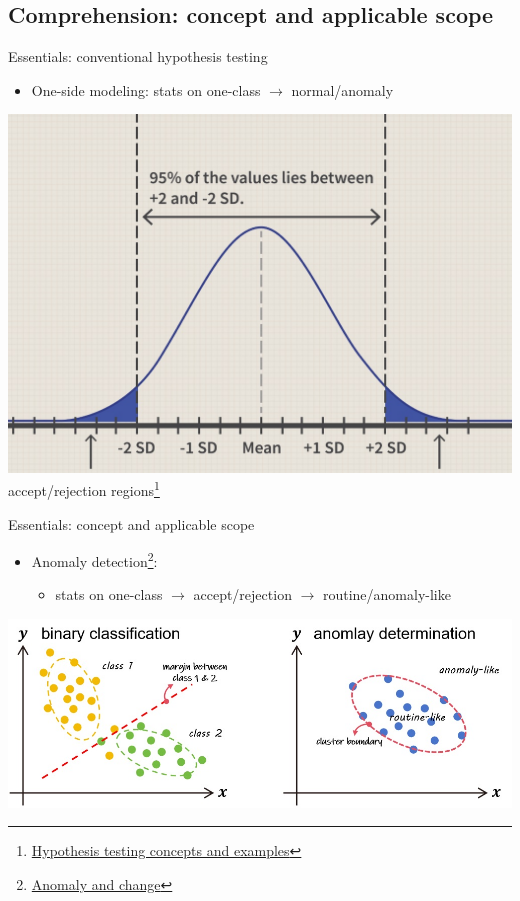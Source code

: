\documentclass[11pt]{beamer}
\newcommand{\uniitem}[1]{\begin{itemize}\item #1 \end{itemize}}
\newcommand{\ftref}[2]{{\color{blue}\footnotesize \href{#1}{#2}}}
\begin{document}
\subsection{Comprehension: concept and applicable scope}

\begin{frame}{Essentials: conventional hypothesis testing}
	\uniitem{One-side modeling: stats on one-class $\rightarrow$ normal/anomaly}
	\centering
	\includegraphics[scale=0.45]{hypotest.jpg}\\
	accept/rejection regions\footnote[frame]{\ftref{https://www.investopedia.com/articles/active-trading/092214/hypothesis-testing-finance-concept-examples.asp}{Hypothesis testing concepts and examples}}
\end{frame}

\begin{frame}{Essentials: concept and applicable scope}
	\uniitem{Anomaly detection\footnote[frame]{\ftref{https://informatics.readthedocs.io/en/latest/supplement/supp\_b2.html\#id1}{Anomaly and change}}:
		\uniitem{stats on one-class $\rightarrow$ accept/rejection $\rightarrow$ routine/anomaly-like}}
	\centering
	\includegraphics[scale=0.65]{anomaly.jpg}
\end{frame}
\end{document}
